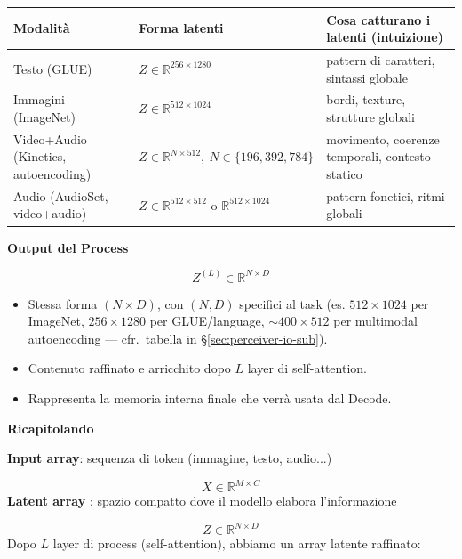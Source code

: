 \documentclass[
  11pt,
]{article}
\newcounter{none} %
\begin{document}
{\def\LTcaptype{none}
\begin{longtable}{@{}
  >{\raggedright\arraybackslash}p{}
  >{\raggedright\arraybackslash}p{}
  >{\raggedright\arraybackslash}p{}@{}}
\toprule\noalign{}
\textbf{Modalità} & \textbf{Forma latenti} & \textbf{Cosa catturano i latenti (intuizione)} \\
\midrule\noalign{}
\endhead
\bottomrule\noalign{}
\endlastfoot
Testo (GLUE) & \(Z \in \mathbb{R}^{256 \times 1280}\) & pattern di caratteri, sintassi globale \\
Immagini (ImageNet) & \(Z \in \mathbb{R}^{512 \times 1024}\) & bordi, texture, strutture globali \\
Video+Audio (Kinetics, autoencoding) & \(Z \in \mathbb{R}^{N \times 512},\ N \in \{196,392,784\}\) & movimento, coerenze temporali, contesto statico \\
Audio (AudioSet, video+audio) & \(Z \in \mathbb{R}^{512 \times 512}\) o \(\mathbb{R}^{512 \times 1024}\) & pattern fonetici, ritmi globali \\
\end{longtable}
}

\textbf{Output del Process}

\[Z^{(L)} \in \mathbb{R}^{N \times D}\]

\begin{itemize}
\item
  Stessa forma \((N \times D)\), con $(N, D)$ specifici al task (es. $512 \times 1024$ per ImageNet, $256 \times 1280$ per GLUE/language, $\sim 400 \times 512$ per multimodal autoencoding --- cfr.\ tabella in \S\ref{sec:perceiver-io-sub}).
\item
  Contenuto raffinato e arricchito dopo \(L\) layer di self-attention.
\item
  Rappresenta la memoria interna finale che verrà usata dal Decode.
\end{itemize}


\textbf{Ricapitolando}

\textbf{Input array}: sequenza di token (immagine, testo, audio...)

\[X \in \mathbb{R}^{M \times C}
\]\textbf{Latent array} : spazio compatto dove il modello elabora
l'informazione

\[Z \in \mathbb{R}^{N \times D}
\]Dopo \(L\) layer di process (self-attention), abbiamo un array latente
raffinato:
\end{document}
